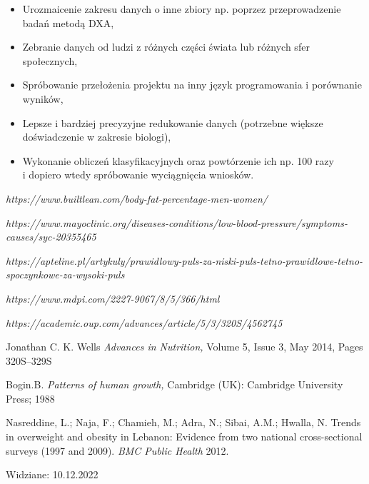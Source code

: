 \documentclass{article}
\begin{document}
 \begin{itemize}
     \item Urozmaicenie zakresu danych o inne zbiory np. poprzez przeprowadzenie badań metodą DXA,
     \item Zebranie danych od ludzi z różnych części świata lub różnych sfer społecznych,
     \item Spróbowanie przełożenia projektu na inny język programowania i porównanie wyników,
     \item Lepsze i bardziej precyzyjne redukowanie danych (potrzebne większe doświadczenie w zakresie biologi),
     \item Wykonanie obliczeń klasyfikacyjnych oraz powtórzenie ich np. 100 razy\\i dopiero wtedy spróbowanie wyciągnięcia wniosków.
 \end{itemize}
\newpage


\begin{thebibliography}{9}
            \emph{https://www.builtlean.com/body-fat-percentage-men-women/}
            
            \emph{https://www.mayoclinic.org/diseases-conditions/low-blood-pressure/symptoms-causes/syc-20355465}
            
            \emph{https://apteline.pl/artykuly/prawidlowy-puls-za-niski-puls-tetno-prawidlowe-tetno-spoczynkowe-za-wysoki-puls}
            
            \emph{https://www.mdpi.com/2227-9067/8/5/366/html}
        
            \emph{https://academic.oup.com/advances/article/5/3/320S/4562745}
            
            Jonathan C. K. Wells
            \emph{Advances in Nutrition,}
             Volume 5, Issue 3, May 2014, Pages 320S–329S
            
            Bogin.B.
            \emph{Patterns of human growth,}
             Cambridge (UK): Cambridge University Press; 1988

            Nasreddine, L.; Naja, F.; Chamieh, M.; Adra, N.; Sibai, A.M.; Hwalla, N. Trends in overweight and obesity in Lebanon: Evidence from two national cross-sectional surveys (1997 and 2009).
            \emph{BMC Public Health} 2012.
              
            
    \end{thebibliography}
    \vfill
    Widziane: 10.12.2022
\end{document}
